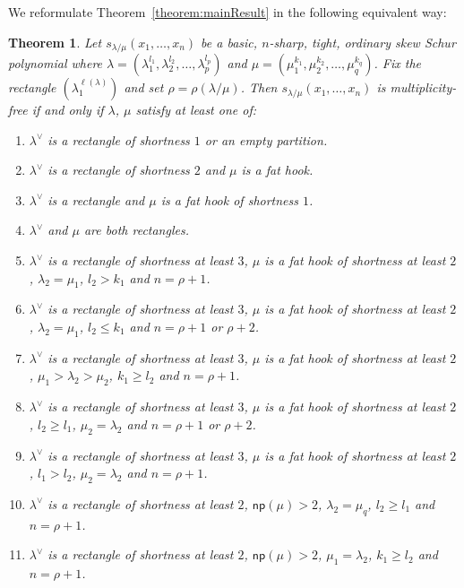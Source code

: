 \documentclass[10pt]{article}
\newtheorem{theorem}{Theorem}[section]
\theoremstyle{definition}
\newcommand{\np}{\mathsf{np}}
\begin{document}
We reformulate Theorem~\ref{theorem:mainResult} in the following equivalent way:


\begin{theorem}
\label{theorem:refomulatedResult}
Let $s_{\lambda / \mu}(x_1,\ldots,x_n)$ be a basic, $n$-sharp, tight, ordinary skew Schur polynomial where $\lambda = (\lambda_1^{l_1},\lambda_2^{l_2},\ldots,\lambda_p^{l_p})$ and $\mu = (\mu_1^{k_1},\mu_2^{k_2},\ldots,\mu_q^{k_q})$. Fix the rectangle $(\lambda_1^{\ell(\lambda)})$ and set $\rho = \rho(\lambda / \mu)$. Then $s_{\lambda / \mu}(x_1,\ldots,x_n)$ is multiplicity-free if and only if $\lambda$, $\mu$ satisfy at least one of:
\begin{enumerate}[label=(\Roman{*})]
	\item\label{theo3.1_1} $\lambda^\vee$ is a rectangle of shortness $1$ or an empty partition.
	\item\label{theo3.1_2} $\lambda^\vee$ is a rectangle of shortness $2$ and $\mu$ is a fat hook.
	\item\label{theo3.1_3} $\lambda^\vee$ is a rectangle and $\mu$ is a fat hook of shortness $1$.
	\item\label{theo3.1_4} $\lambda^\vee$ and $\mu$ are both rectangles.
	\item\label{theo3.1_5} $\lambda^\vee$ is a rectangle of shortness at least $3$, $\mu$ is a fat hook of shortness at least $2$, $\lambda_2 = \mu_1$, $l_2>k_1$ and $n = \rho+1$.
	\item\label{theo3.1_6} $\lambda^\vee$ is a rectangle of shortness at least $3$, $\mu$ is a fat hook of shortness at least $2$, $\lambda_2 = \mu_1$, $l_2\leq k_1$ and $n = \rho+1$ or $\rho+2$.
	\item\label{theo3.1_7} $\lambda^\vee$ is a rectangle of shortness at least $3$, $\mu$ is a fat hook of shortness at least $2$, $\mu_1>\lambda_2>\mu_2$, $k_1\geq l_2$ and $n = \rho+1$.
	\item\label{theo3.1_8} $\lambda^\vee$ is a rectangle of shortness at least $3$, $\mu$ is a fat hook of shortness at least $2$, $l_2\geq l_1$, $\mu_2=\lambda_2$ and $n = \rho+1$ or $\rho+2$.
	\item\label{theo3.1_9} $\lambda^\vee$ is a rectangle of shortness at least $3$, $\mu$ is a fat hook of shortness at least $2$, $l_1> l_2$, $\mu_2=\lambda_2$ and $n = \rho+1$.
	\item\label{theo3.1_10} $\lambda^\vee$ is a rectangle of shortness at least $2$, $\np (\mu)>2$, $\lambda_2 = \mu_q$, $l_2\geq l_1$ and $n = \rho+1$.
	\item\label{theo3.1_11} $\lambda^\vee$ is a rectangle of shortness at least $2$, $\np (\mu) > 2$, $\mu_1 = \lambda_2$, $k_1 \geq l_2$ and $n = \rho+1$.
\end{enumerate}
\end{theorem}
\end{document}
